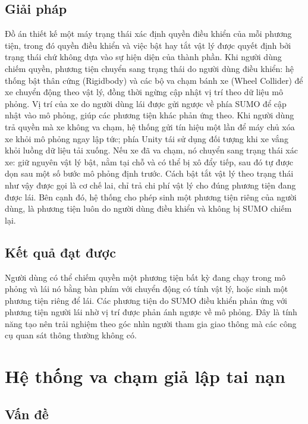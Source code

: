 ﻿\documentclass[../DoAn.tex]{subfiles}
\begin{document}
\subsection{Giải pháp}

Đồ án thiết kế một máy trạng thái xác định quyền điều khiển của mỗi phương tiện,
trong đó quyền điều khiển và việc bật hay tắt vật lý được quyết định bởi trạng
thái chứ không dựa vào sự hiện diện của thành phần. Khi người dùng chiếm quyền,
phương tiện chuyển sang trạng thái do người dùng điều khiển: hệ thống bật thân
cứng (Rigidbody) và các bộ va chạm bánh xe (Wheel Collider) để xe chuyển động
theo vật lý, đồng thời ngừng cập nhật vị trí theo dữ liệu mô phỏng. Vị trí của xe
do người dùng lái được gửi ngược về phía \gls{SUMO} để cập nhật vào mô phỏng,
giúp các phương tiện khác phản ứng theo. Khi người dùng trả quyền mà xe không va chạm,
hệ thống gửi tín hiệu một lần để máy chủ xóa xe khỏi mô phỏng ngay lập tức;
phía Unity tái sử dụng đối tượng khi xe vắng khỏi luồng dữ liệu tải xuống.
Nếu xe đã va chạm, nó chuyển sang trạng thái xác xe: giữ nguyên vật lý bật,
nằm tại chỗ và có thể bị xô đẩy tiếp, sau đó tự được dọn sau một số bước mô
phỏng định trước. Cách bật tắt vật lý theo trạng thái như vậy được gọi là cơ chế lai,
chỉ trả chi phí vật lý cho đúng phương tiện đang được lái. Bên cạnh đó, hệ thống
cho phép sinh một phương tiện riêng của người dùng, là phương tiện luôn do người
dùng điều khiển và không bị \gls{SUMO} chiếm lại.

\subsection{Kết quả đạt được}

Người dùng có thể chiếm quyền một phương tiện bất kỳ đang chạy trong mô phỏng và
lái nó bằng bàn phím với chuyển động có tính vật lý, hoặc sinh một phương tiện
riêng để lái. Các phương tiện do \gls{SUMO} điều khiển phản ứng với phương tiện
người lái nhờ vị trí được phản ánh ngược về mô phỏng. Đây là tính năng tạo nên
trải nghiệm theo góc nhìn người tham gia giao thông mà các công cụ quan sát thông
thường không có.

\section{Hệ thống va chạm giả lập tai nạn}
\label{sec:va-cham}

\subsection{Vấn đề}
\end{document}
